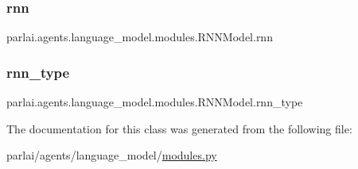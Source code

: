 \subsubsection{\texorpdfstring{rnn}{rnn}}
{\footnotesize\ttfamily parlai.\+agents.\+language\+\_\+model.\+modules.\+R\+N\+N\+Model.\+rnn}

\mbox{\label{classparlai_1_1agents_1_1language__model_1_1modules_1_1RNNModel_ac277c84d2fe07dfcf0f629d321c7316a}} 
\subsubsection{\texorpdfstring{rnn\+\_\+type}{rnn\_type}}
{\footnotesize\ttfamily parlai.\+agents.\+language\+\_\+model.\+modules.\+R\+N\+N\+Model.\+rnn\+\_\+type}



The documentation for this class was generated from the following file\+:\begin{DoxyCompactItemize}
\item 
parlai/agents/language\+\_\+model/\hyperlink{parlai_2agents_2language__model_2modules_8py}{modules.\+py}\end{DoxyCompactItemize}
